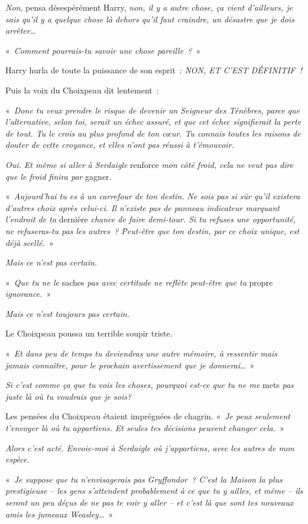 \emph{Non}, pensa désespérément Harry, \emph{non, il y a autre chose, ça vient d'ailleurs, je sais qu'il y a quelque chose là dehors qu'il faut craindre, un désastre que je dois arrêter…}

«~\emph{Comment pourrais-tu savoir une chose pareille~?}~»

Harry hurla de toute la puissance de son esprit~: \emph{NON, ET C'EST DÉFINITIF~!}

Puis la voix du Choixpeau dit lentement~:

«~\emph{Donc tu veux prendre le risque de devenir un Seigneur des Ténèbres, parce que l'alternative, selon toi, serait un échec assuré, et que cet échec signifierait la perte de tout.
Tu le crois au plus profond de ton cœur.
Tu connais toutes les raisons de douter de cette croyance, et elles n'ont pas réussi à t'émouvoir.}

\emph{Oui. Et même si aller à Serdaigle} renforce \emph{mon côté froid, cela ne veut pas dire que le froid finira par} gagner\emph{.}

«~\emph{Aujourd'hui tu es à un carrefour de ton destin.
Ne sois pas si sûr qu'il existera d'autres choix après celui-ci.
Il n'existe pas de panneau indicateur marquant l'endroit de ta} dernière \emph{chance de faire demi-tour.
Si tu refuses une opportunité, ne refuseras-tu pas les autres~?
Peut-être que ton destin, par ce choix unique, est déjà scellé.}~»

\emph{Mais ce n'est pas certain.}

«~\emph{Que tu ne le} saches \emph{pas avec certitude ne reflète peut-être que ta} propre \emph{ignorance.}~»

\emph{Mais ce n'est toujours pas certain.}

Le Choixpeau poussa un terrible soupir triste.

«~\emph{Et dans peu de temps tu deviendras une autre mémoire, à ressentir mais jamais connaître, pour le prochain avertissement que je donnerai…}~»

\emph{Si c'est comme ça que tu vois les choses, pourquoi est-ce que tu ne me} mets \emph{pas juste là où tu voudrais que je sois?}

Les pensées du Choixpeau étaient imprégnées de chagrin.
«~\emph{Je peux seulement t'envoyer là où tu appartiens.
Et seules tes décisions peuvent changer cela.}~»

\emph{Alors c'est acté. Envoie-moi à Serdaigle où j'appartiens, avec les autres de mon espèce.}

«~\emph{Je suppose que tu n'envisagerais pas Gryffondor~?
C'est la Maison la plus prestigieuse -- les gens s'attendent probablement à ce que tu y ailles, et même -- ils seront un peu déçus de ne pas te voir y aller -- et c'est là que sont tes nouveaux amis les jumeaux Weasley…}~»

